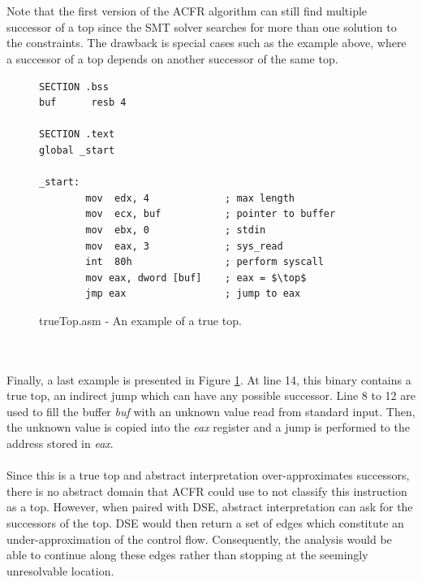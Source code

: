 \documentclass{kththesis}
\renewcommand{\it}[1]{\textit{#1}}
\begin{document}
\\ \\
Note that the first version of the ACFR algorithm can still find multiple successor of a top since the SMT solver searches for more than one solution to the constraints. The drawback is special cases such as the example above, where a successor of a top depends on another successor of the same top.
\begin{figure}[ht]
    \centering
\begin{tcolorbox}
\begin{verbatim}
SECTION .bss
buf      resb 4

SECTION .text
global _start

_start:
        mov  edx, 4             ; max length
        mov  ecx, buf           ; pointer to buffer
        mov  ebx, 0             ; stdin
        mov  eax, 3             ; sys_read
        int  80h                ; perform syscall
        mov eax, dword [buf]    ; eax = $\top$
        jmp eax                 ; jump to eax
\end{verbatim}
\end{tcolorbox}
\caption{trueTop.asm - An example of a true top.}
    \label{fig:trueTop.asm}
\end{figure}
\\ \\ 
Finally, a last example is presented in Figure \ref{fig:trueTop.asm}. At line 14, this binary contains a true top, an indirect jump which can have any possible successor. Line 8 to 12 are used to fill the buffer \it{buf} with an unknown value read from standard input. Then, the unknown value is copied into the \it{eax} register and a jump is performed to the address stored in \it{eax}.
\\ \\
Since this is a true top and abstract interpretation over-approximates successors, there is no abstract domain that ACFR could use to not classify this instruction as a top. However, when paired with DSE, abstract interpretation can ask for the successors of the top. DSE would then return a set of edges which constitute an under-approximation of the control flow. Consequently, the analysis would be able to continue along these edges rather than stopping at the seemingly unresolvable location.

\clearpage
\end{document}
